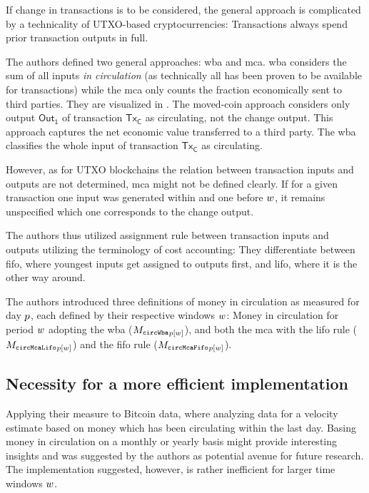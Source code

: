 If change in transactions is to be considered, the general approach is complicated by a technicality of UTXO-based cryptocurrencies: Transactions always spend prior transaction outputs in full. %

The authors defined two general approaches: \ac{wba} and \ac{mca}.  %
\ac{wba} considers the sum of all inputs \textit{in circulation} (as technically all has been proven to be available for transactions) while the \ac{mca} only counts the fraction economically sent to third parties.  %
%
They are visualized in .  %
The moved-coin approach considers only output $\mathsf{Out_1}$ of transaction $\mathsf{Tx_C}$ as circulating, not the change output.  %
This approach captures the net economic value transferred to a third party.  %
The \ac{wba} classifies the whole input of transaction $\mathsf{Tx_C}$ as circulating.  %

However, as for UTXO blockchains the relation between transaction inputs and outputs are not determined, \ac{mca} might not be defined clearly. %
If for a given transaction one input was generated within and one before ${w}$, it remains unspecified which one corresponds to the change output.  %

The authors thus utilized assignment rule between transaction inputs and outputs utilizing the terminology of cost accounting: %
They differentiate between \ac{fifo}, where youngest inputs get assigned to outputs first, and \ac{lifo}, where it is the other way around.  %

The authors introduced three definitions of money in circulation as measured for day \({p}\), each defined by their respective windows \({w}\): %
Money in circulation for period ${w}$ adopting the \ac{wba} ($ {{M_{\mathtt{circWba}}}_{{p}[{{w}}]}} $), and both the \ac{mca} with the \ac{lifo} rule ($ {{M_{\mathtt{circMcaLifo}}}_{{p}[{{w}}]}} $) and the \ac{fifo} rule ($ {{M_{\mathtt{circMcaFifo}}}_{{p}[{{w}}]}} $).

\subsection{Necessity for a more efficient implementation}
\label{sec:necessity_effi}%
Applying their measure to Bitcoin data, \cite{pernice2019cryptocurrencies} where analyzing data for a velocity estimate based on money which has been circulating within the last day. %
Basing money in circulation on a monthly or yearly basis might provide interesting insights and was suggested by the authors as potential avenue for future research. %
The implementation suggested, however, is rather inefficient for larger time windows \({w}\). %

